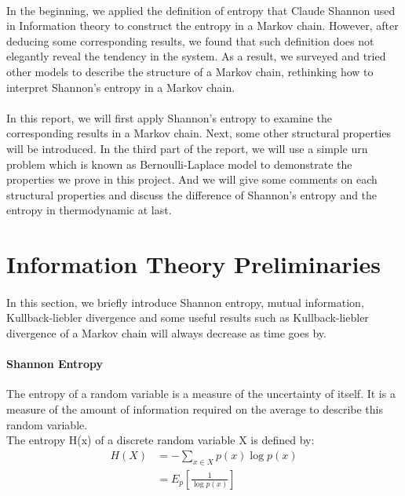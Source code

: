 \documentclass[a4paper, 11pt]{article} %
\begin{document}
\paragraph{}
In the beginning, we applied the definition of entropy that Claude Shannon used in Information theory to
construct the entropy in a Markov chain. However, after deducing some corresponding results, we found that
such definition does not elegantly reveal the tendency in the system. As a result, we surveyed and tried
other models to describe the structure of a Markov chain, rethinking how to interpret Shannon's entropy
in a Markov chain.

\paragraph{}
In this report, we will first apply Shannon's entropy to examine the corresponding results in a Markov
chain. Next, some other structural properties will be introduced. In the third part of the report, we will use
a simple urn problem which is known as Bernoulli-Laplace model to demonstrate the properties we prove in this project. And we will give some
comments on each structural properties and discuss the difference of Shannon's entropy and the entropy in
thermodynamic at last.%

\section*{Information Theory Preliminaries}
\paragraph{}
In this section, we briefly introduce Shannon entropy, mutual information, Kullback-liebler divergence  and some useful results such as Kullback-liebler divergence of a Markov chain will always decrease as time goes by.
\paragraph{Shannon Entropy}
The entropy of a random variable is a measure of the uncertainty of itself. It is a measure of the amount of information required on the average to describe this random variable.\\
The entropy H(x) of a discrete random variable X is defined by:
\begin{align*} 
 H(X)	&= -\sum_{x\in X}p(x)\log p(x)\\
&=E_p[\frac{1}{\log p(x)}]
\end{align*}
\end{document}
